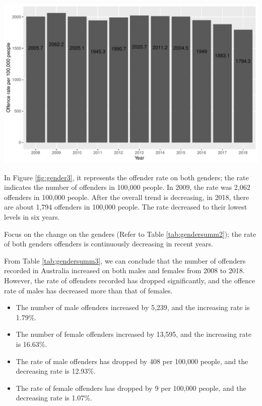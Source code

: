 \documentclass[11pt,a4paper,]{article}
\providecommand{\tightlist}{%
  \setlength{\itemsep}{0pt}\setlength{\parskip}{0pt}}
\let\origfigure\figure
\let\endorigfigure\endfigure
\renewenvironment{figure}[1][2] {
\expandafter\origfigure\expandafter[H]
} {
\endorigfigure
}
\begin{document}
\begin{figure}
\centering
\includegraphics{ETC5513-Assignment4_files/figure-latex/gender3-1.pdf}
\caption{\label{fig:gender3}Rate of offenders recorded in Australia}
\end{figure}

In Figure \ref{fig:gender3}, it represents the offender rate on both genders; the rate indicates the number of offenders in 100,000 people. In 2009, the rate was 2,062 offenders in 100,000 people. After the overall trend is decreasing, in 2018, there are about 1,794 offenders in 100,000 people. The rate decreased to their lowest levels in six years.

Focus on the change on the genders (Refer to Table \ref{tab:gendersumm2}); the rate of both genders offenders is continuously decreasing in recent years.

From Table \ref{tab:gendersumm3}, we can conclude that the number of offenders recorded in Australia increased on both males and females from 2008 to 2018. However, the rate of offenders recorded has dropped significantly, and the offence rate of males has decreased more than that of females.

\begin{itemize}
\tightlist
\item
  The number of male offenders increased by 5,239, and the increasing rate is 1.79\%.\\
\item
  The number of female offenders increased by 13,595, and the increasing rate is 16.63\%.\\
\item
  The rate of male offenders has dropped by 408 per 100,000 people, and the decreasing rate is 12.93\%.\\
\item
  The rate of female offenders has dropped by 9 per 100,000 people, and the decreasing rate is 1.07\%.
\end{itemize}
\end{document}
